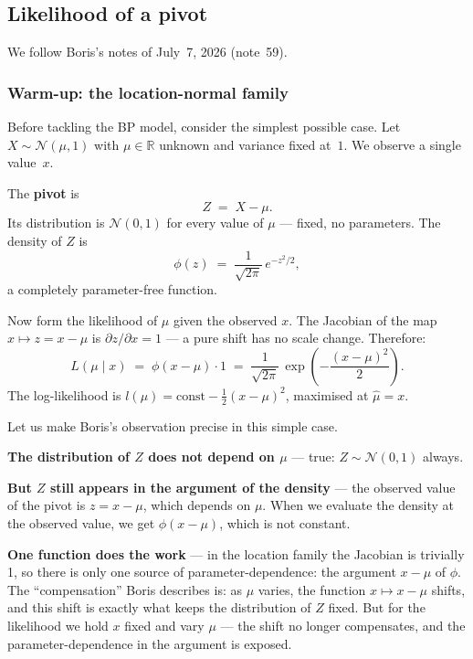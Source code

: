 \documentclass[a4paper,oneside,12pt]{extarticle}
\theoremstyle{plain}
\theoremstyle{definition}
\theoremstyle{remark}
\begin{document}

\subsection{Likelihood of a pivot}
\label{subsec:pivot-likelihood}

We follow Boris's notes of July~7, 2026 (note~59).

\subsubsection*{Warm-up: the location-normal family}

Before tackling the BP model, consider the simplest possible case.
Let $X \sim \mathcal{N}(\mu, 1)$ with $\mu \in \mathbb{R}$ unknown
and variance fixed at~$1$.  We observe a single value~$x$.

The \textbf{pivot} is
\[
  Z \;=\; X - \mu.
\]
Its distribution is $\mathcal{N}(0,1)$ for every value of $\mu$ —
fixed, no parameters.  The density of $Z$ is
\[
  \phi(z) \;=\; \frac{1}{\sqrt{2\pi}}\,e^{-z^2/2},
\]
a completely parameter-free function.

Now form the likelihood of $\mu$ given the observed $x$.  The
Jacobian of the map $x \mapsto z = x - \mu$ is $\partial z/\partial
x = 1$ — a pure shift has no scale change.  Therefore:
\[
  L(\mu \mid x)
  \;=\; \phi(x - \mu) \cdot 1
  \;=\; \frac{1}{\sqrt{2\pi}}\,\exp\!\left(-\frac{(x-\mu)^2}{2}\right).
\]
The log-likelihood is $l(\mu) = \mathrm{const} - \frac{1}{2}(x-\mu)^2$,
maximised at $\hat\mu = x$.

\medskip
Let us make Boris's observation precise in this simple case.

\textbf{The distribution of $Z$ does not depend on $\mu$} — true: $Z
\sim \mathcal{N}(0,1)$ always.

\textbf{But $Z$ still appears in the argument of the density} — the
observed value of the pivot is $z = x - \mu$, which depends on $\mu$.
When we evaluate the density at the observed value, we get
$\phi(x-\mu)$, which is not constant.

\textbf{One function does the work} — in the location family the
Jacobian is trivially 1, so there is only one source of
parameter-dependence: the argument $x - \mu$ of $\phi$.  The
``compensation'' Boris describes is: as $\mu$ varies, the function
$x \mapsto x - \mu$ shifts, and this shift is exactly what keeps the
distribution of $Z$ fixed.  But for the likelihood we hold $x$ fixed
and vary $\mu$ — the shift no longer compensates, and the
parameter-dependence in the argument is exposed.
\end{document}
